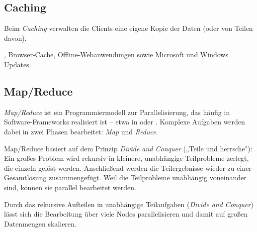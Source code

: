 \subsection{Caching}
Beim \emph{Caching} verwalten die Clients eine eigene Kopie der Daten (oder von Teilen davon).

\begin{procon}
\end{procon}

\begin{beispiel}
, Browser-Cache, Offline-Webanwendungen sowie Microsoft  und Windows Updates.
\end{beispiel}

\subsection{Map/Reduce}
\emph{Map/Reduce} ist ein Programmiermodell zur Parallelisierung, das häufig in Software-Frameworks realisiert ist -- etwa in  oder . Komplexe Aufgaben werden dabei in zwei Phasen bearbeitet: \emph{Map} und \emph{Reduce}.

\begin{infobox}
Map/Reduce basiert auf dem Prinzip \emph{Divide and Conquer} („Teile und herrsche"): Ein großes Problem wird rekursiv in kleinere, unabhängige Teilprobleme zerlegt, die einzeln gelöst werden. Anschließend werden die Teilergebnisse wieder zu einer Gesamtlösung zusammengefügt. Weil die Teilprobleme unabhängig voneinander sind, können sie parallel bearbeitet werden.
\end{infobox}

\begin{process}
\end{process}

\begin{merksatz}[Kernidee]
Durch das rekursive Aufteilen in unabhängige Teilaufgaben (\emph{Divide and Conquer}) lässt sich die Bearbeitung über viele Nodes parallelisieren und damit auf großen Datenmengen skalieren.
\end{merksatz}

\newpage
